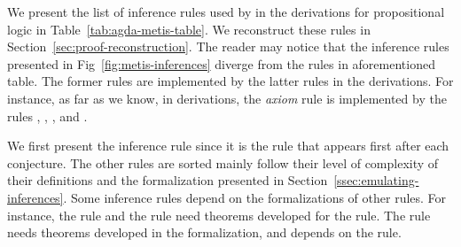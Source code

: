 \documentclass[../main.tex]{subfiles}
\begin{document}
We present the list of inference rules used by \Metis in the \TSTP derivations
for propositional logic in Table~\ref{tab:agda-metis-table}. We reconstruct
these rules in Section~\ref{sec:proof-reconstruction}. The reader may notice
that the inference rules presented in Fig~\ref{fig:metis-inferences} diverge
from the rules in aforementioned table. The former rules are implemented by the
latter rules in the \TSTP derivations.
For instance, as far as we know, in \TSTP
derivations,  the \emph{axiom} rule is implemented by the rules
\canonicalize, \clausify, \conjunct, and \simplify.

We first present the \strip inference rule since it is the rule that appears
first after each conjecture. The other rules are sorted mainly follow their
level of complexity of their definitions and the formalization presented in
Section~\ref{ssec:emulating-inferences}. Some inference rules depend on the
formalizations of other rules. For instance, the \simplify rule and the
\clausify rule need theorems developed for the \canonicalize rule. The
\canonicalize rule needs theorems developed in the \resolve formalization,
and \resolve depends on the \conjunct rule.

\end{document}
